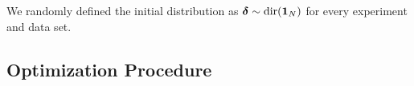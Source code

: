 %

%
We randomly defined the initial distribution as $\boldsymbol{\delta} \sim \text{dir}(\mathbf{1}_N)$ for every experiment and data set.

\subsection{Optimization Procedure}


